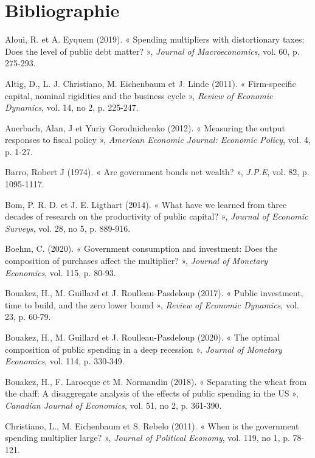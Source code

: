 \documentclass[12pt,letterpaper]{article}
\begin{document}
\section*{Bibliographie}
\begin{list}{}{\setlength{\leftmargin}{2em}\setlength{\itemindent}{-2em}\setlength{\itemsep}{0.3em}}
\small
\item Aloui, R. et A. Eyquem (2019). « Spending multipliers with distortionary taxes: Does the level of public debt matter? », \emph{Journal of Macroeconomics}, vol. 60, p. 275-293.
\item Altig, D., L. J. Christiano, M. Eichenbaum et J. Linde (2011). « Firm-specific capital, nominal rigidities and the business cycle », \emph{Review of Economic Dynamics}, vol. 14, no 2, p. 225-247.
\item Auerbach, Alan, J et Yuriy Gorodnichenko (2012). « Measuring the output responses to fiscal policy », \emph{American Economic Journal: Economic Policy}, vol. 4, p. 1-27.
\item Barro, Robert J (1974). « Are government bonds net wealth? », \emph{J.P.E}, vol. 82, p. 1095-1117.
\item Bom, P. R. D. et J. E. Ligthart (2014). « What have we learned from three decades of research on the productivity of public capital? », \emph{Journal of Economic Surveys}, vol. 28, no 5, p. 889-916.
\item Boehm, C. (2020). « Government consumption and investment: Does the composition of purchases affect the multiplier? », \emph{Journal of Monetary Economics}, vol. 115, p. 80-93.
\item Bouakez, H., M. Guillard et J. Roulleau-Pasdeloup (2017). « Public investment, time to build, and the zero lower bound », \emph{Review of Economic Dynamics}, vol. 23, p. 60-79.
\item Bouakez, H., M. Guillard et J. Roulleau-Pasdeloup (2020). « The optimal composition of public spending in a deep recession », \emph{Journal of Monetary Economics}, vol. 114, p. 330-349.
\item Bouakez, H., F. Larocque et M. Normandin (2018). « Separating the wheat from the chaff: A disaggregate analysis of the effects of public spending in the US », \emph{Canadian Journal of Economics}, vol. 51, no 2, p. 361-390.
\item Christiano, L., M. Eichenbaum et S. Rebelo (2011). « When is the government spending multiplier large? », \emph{Journal of Political Economy}, vol. 119, no 1, p. 78-121.

\end{list}
\end{document}
